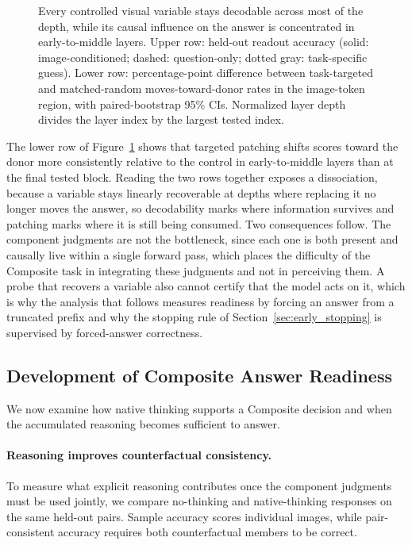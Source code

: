 \documentclass{article} %
\begin{document}
\begin{figure}[t]
    \caption{Every controlled visual variable stays decodable across most of the depth, while its causal influence on the answer is concentrated in early-to-middle layers. Upper row: held-out readout accuracy (solid: image-conditioned; dashed: question-only; dotted gray: task-specific guess). Lower row: percentage-point difference between task-targeted and matched-random moves-toward-donor rates in the image-token region, with paired-bootstrap 95\% CIs. Normalized layer depth divides the layer index by the largest tested index.}
    \label{fig:primitive_analysis}
\end{figure}

The lower row of Figure~\ref{fig:primitive_analysis} shows that targeted patching shifts scores toward the donor more consistently relative to the control in early-to-middle layers than at the final tested block. Reading the two rows together exposes a dissociation, because a variable stays linearly recoverable at depths where replacing it no longer moves the answer, so decodability marks where information survives and patching marks where it is still being consumed. Two consequences follow. The component judgments are not the bottleneck, since each one is both present and causally live within a single forward pass, which places the difficulty of the Composite task in integrating these judgments and not in perceiving them. A probe that recovers a variable also cannot certify that the model acts on it, which is why the analysis that follows measures readiness by forcing an answer from a truncated prefix and why the stopping rule of Section~\ref{sec:early_stopping} is supervised by forced-answer correctness.

\subsection{Development of Composite Answer Readiness}

We now examine how native thinking supports a Composite decision and when the accumulated reasoning becomes sufficient to answer.

\paragraph{Reasoning improves counterfactual consistency.}
To measure what explicit reasoning contributes once the component judgments must be used jointly, we compare no-thinking and native-thinking responses on the same held-out pairs. Sample accuracy scores individual images, while pair-consistent accuracy requires both counterfactual members to be correct.
\end{document}
